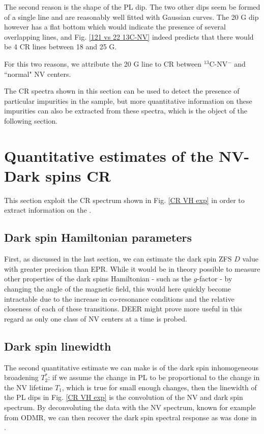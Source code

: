 \documentclass[a4paper,11pt]{report}
\begin{document}
The second reason is the shape of the PL dip. The two other dips seem be formed of a single line and are reasonably well fitted with Gaussian curves. The 20 G dip however has a flat bottom which would indicate the presence of several overlapping lines, and Fig. \ref{121 vs 22 13C-NV} indeed predicts that there would be 4 CR lines between 18 and 25 G.

For this two reasons, we attribute the 20 G line to CR between $^{13}$C-NV$^-$ and ``normal" NV centers.

\bigskip

The CR spectra shown in this section can be used to detect the presence of particular impurities in the sample, but more quantitative information on these impurities can also be extracted from these spectra, which is the object of the following section.

\section{Quantitative estimates of the NV-Dark spins CR}

This section exploit the CR spectrum shown in Fig. \ref{CR VH exp} in order to extract information on the  .

\subsection{Dark spin Hamiltonian parameters}

First, as discussed in the last section, we can estimate the dark spin ZFS $D$ value with greater precision than EPR. While it would be in theory possible to measure other properties of the dark spins Hamiltonian - such as the $g$-factor - by changing the angle of the magnetic field, this would here quickly become intractable due to the increase in co-resonance conditions and the relative closeness of each of these transitions. DEER might prove more useful in this regard as only one class of NV centers at a time is probed.

\subsection{Dark spin linewidth}

The second quantitative estimate we can make is of the dark spin inhomogeneous broadening $T_2^*$: if we assume the change in PL to be proportional to the change in the NV lifetime $T_1$, which is true for small enough changes, then the linewidth of the PL dips in Fig. \ref{CR VH exp} is the convolution of the NV and dark spin spectrum. By deconvoluting the data with the NV spectrum, known for example from ODMR, we can then recover the dark spin spectral response as was done in \citep{hall2016detection}. 
\end{document}

